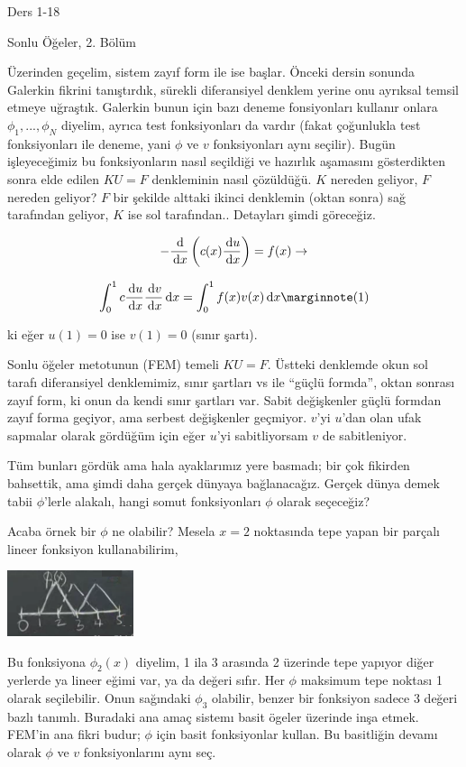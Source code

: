 \documentclass[12pt,fleqn]{article}\usepackage{../../common}
\begin{document}
Ders 1-18

Sonlu Öğeler, 2. Bölüm

Üzerinden geçelim, sistem zayıf form ile ise başlar. Önceki dersin sonunda
Galerkin fikrini tanıştırdık, sürekli diferansiyel denklem yerine onu ayrıksal
temsil etmeye uğraştık. Galerkin bunun için bazı deneme fonsiyonları kullanır
onlara $\phi_1,...,\phi_N$ diyelim, ayrıca test fonksiyonları da vardır (fakat
çoğunlukla test fonksiyonları ile deneme, yani $\phi$ ve $v$ fonksiyonları aynı
seçilir). Bugün işleyeceğimiz bu fonksiyonların nasıl seçildiği ve hazırlık
aşamasını gösterdikten sonra elde edilen $KU = F$ denkleminin nasıl çözüldüğü. $K$
nereden geliyor, $F$ nereden geliyor? $F$ bir şekilde alttaki ikinci denklemin
(oktan sonra) sağ tarafından geliyor, $K$ ise sol tarafından.. Detayları şimdi
göreceğiz.

$$
- \frac{\,\mathrm{d}}{\,\mathrm{d} x} \left( c(x) \frac{\,\mathrm{d} u}{\,\mathrm{d} x} \right) = f(x) \to
$$

$$
\int _{0}^{1} c \frac{\ud u}{\ud x} \frac{\ud v}{\ud x} \ud x =
\int _{0}^{1} f(x) v(x) \ud x
\mlabel{1}
$$

ki eğer $u(1)=0$ ise $v(1) = 0$ (sınır şartı).

Sonlu öğeler metotunun (FEM) temeli $KU = F$. Üstteki denklemde okun sol tarafı
diferansiyel denklemimiz, sınır şartları vs ile ``güçlü formda'', oktan sonrası
zayıf form, ki onun da kendi sınır şartları var. Sabit değişkenler güçlü formdan
zayıf forma geçiyor, ama serbest değişkenler geçmiyor. $v$'yi $u$'dan olan ufak
sapmalar olarak gördüğüm için eğer $u$'yi sabitliyorsam $v$ de sabitleniyor.

Tüm bunları gördük ama hala ayaklarımız yere basmadı; bir çok fikirden
bahsettik, ama şimdi daha gerçek dünyaya bağlanacağız. Gerçek dünya demek tabii
$\phi$'lerle alakalı, hangi somut fonksiyonları $\phi$ olarak seçeceğiz?

Acaba örnek bir $\phi$ ne olabilir? Mesela $x=2$ noktasında tepe yapan bir
parçalı lineer fonksiyon kullanabilirim,

\includegraphics[width=10em]{compscieng_1_18_01.png}

Bu fonksiyona $\phi_2(x)$ diyelim, 1 ila 3 arasında 2 üzerinde tepe yapıyor
diğer yerlerde ya lineer eğimi var, ya da değeri sıfır. Her $\phi$ maksimum tepe
noktası 1 olarak seçilebilir. Onun sağındaki $\phi_3$ olabilir, benzer bir
fonksiyon sadece 3 değeri bazlı tanımlı. Buradaki ana amaç sistemı basit ögeler
üzerinde inşa etmek. FEM'in ana fikri budur; $\phi$ için basit fonksiyonlar
kullan. Bu basitliğin devamı olarak $\phi$ ve $v$ fonksiyonlarını aynı seç.
\end{document}
